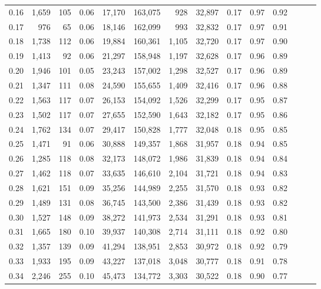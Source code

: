 \begin{tabular}{rrrrrrrrrrrrrr}
0.16 &  1,659 &  105 &  0.06 &   17,170 &  163,075 &     928 &  32,897 &  0.17 &  0.97 &      0.92 \\
0.17 &    976 &   65 &  0.06 &   18,146 &  162,099 &     993 &  32,832 &  0.17 &  0.97 &      0.91 \\
0.18 &  1,738 &  112 &  0.06 &   19,884 &  160,361 &   1,105 &  32,720 &  0.17 &  0.97 &      0.90 \\
0.19 &  1,413 &   92 &  0.06 &   21,297 &  158,948 &   1,197 &  32,628 &  0.17 &  0.96 &      0.89 \\
0.20 &  1,946 &  101 &  0.05 &   23,243 &  157,002 &   1,298 &  32,527 &  0.17 &  0.96 &      0.89 \\
0.21 &  1,347 &  111 &  0.08 &   24,590 &  155,655 &   1,409 &  32,416 &  0.17 &  0.96 &      0.88 \\
0.22 &  1,563 &  117 &  0.07 &   26,153 &  154,092 &   1,526 &  32,299 &  0.17 &  0.95 &      0.87 \\
0.23 &  1,502 &  117 &  0.07 &   27,655 &  152,590 &   1,643 &  32,182 &  0.17 &  0.95 &      0.86 \\
0.24 &  1,762 &  134 &  0.07 &   29,417 &  150,828 &   1,777 &  32,048 &  0.18 &  0.95 &      0.85 \\
0.25 &  1,471 &   91 &  0.06 &   30,888 &  149,357 &   1,868 &  31,957 &  0.18 &  0.94 &      0.85 \\
0.26 &  1,285 &  118 &  0.08 &   32,173 &  148,072 &   1,986 &  31,839 &  0.18 &  0.94 &      0.84 \\
0.27 &  1,462 &  118 &  0.07 &   33,635 &  146,610 &   2,104 &  31,721 &  0.18 &  0.94 &      0.83 \\
0.28 &  1,621 &  151 &  0.09 &   35,256 &  144,989 &   2,255 &  31,570 &  0.18 &  0.93 &      0.82 \\
0.29 &  1,489 &  131 &  0.08 &   36,745 &  143,500 &   2,386 &  31,439 &  0.18 &  0.93 &      0.82 \\
0.30 &  1,527 &  148 &  0.09 &   38,272 &  141,973 &   2,534 &  31,291 &  0.18 &  0.93 &      0.81 \\
0.31 &  1,665 &  180 &  0.10 &   39,937 &  140,308 &   2,714 &  31,111 &  0.18 &  0.92 &      0.80 \\
0.32 &  1,357 &  139 &  0.09 &   41,294 &  138,951 &   2,853 &  30,972 &  0.18 &  0.92 &      0.79 \\
0.33 &  1,933 &  195 &  0.09 &   43,227 &  137,018 &   3,048 &  30,777 &  0.18 &  0.91 &      0.78 \\
0.34 &  2,246 &  255 &  0.10 &   45,473 &  134,772 &   3,303 &  30,522 &  0.18 &  0.90 &      0.77 \\

\end{tabular}
